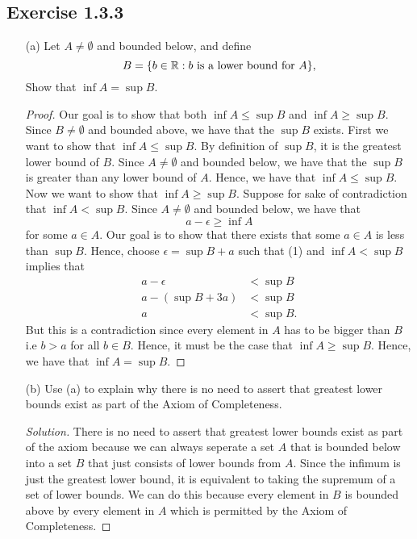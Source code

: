 \subsection{Exercise 1.3.3} \begin{enumerate} \item[(a)] Let \( A \neq \emptyset \) and bounded below, and define \[ B = \{ b \in \mathbb{R} : b \text{ is a lower bound for   } A  \},\] Show that \( \inf A = \sup B \). \begin{proof} Our goal is to show that both \( \inf A \leq \sup B \) and \( \inf A \geq \sup B \). Since \( B \neq \emptyset\) and bounded above, we have that the \( \sup B \) exists. First we want to show that \( \inf A \leq \sup B \). By definition of \( \sup B \), it is the greatest lower bound of \( B \). Since \( A \neq \emptyset \) and bounded below, we have that the \( \sup B \) is greater than any lower bound of \( A \). Hence, we have that \( \inf A \leq \sup B \). Now we want to show that \( \inf A \geq \sup B \). Suppose for sake of contradiction that \( \inf A < \sup B \). Since \( A \neq \emptyset\) and bounded below, we have that \[ a - \epsilon \geq \inf A \tag{1}\] for some \( a \in A \). Our goal is to show that there exists that some \( a \in A \) is less than \( \sup B \). Hence, choose \( \epsilon = \sup B + a \) such that (1) and \( \inf A < \sup B \) implies that \begin{align*} a - \epsilon &< \sup B \\ a - (\sup B + 3a) &< \sup B \\ a &< \sup B. \end{align*}  But this is a contradiction since every element in \(A  \) has to be bigger than \( B \) i.e \( b > a \) for all \( b \in B \). Hence, it must be the case that \(\inf A \geq \sup B  \). Hence, we have that \( \inf A = \sup B \). \end{proof} \item[(b)] Use (a) to explain why there is no need to assert that greatest lower bounds exist as part of the Axiom of Completeness. \begin{proof}[Solution] There is no need to assert that greatest lower bounds exist as part of the axiom because we can always seperate a set \( A \) that is bounded below into a set \( B \) that just consists of lower bounds from \( A \). Since the infimum is just the greatest lower bound, it is equivalent to taking the supremum of a set of lower bounds. We can do this because every element in \( B \) is bounded above by every element in \( A \) which is permitted by the Axiom of Completeness.  \end{proof}
\end{enumerate}

